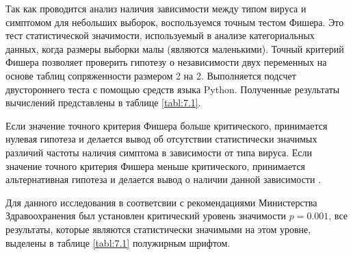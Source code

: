 \documentclass{article}
\begin{document}
Так как проводится анализ наличия зависимости между типом вируса и симптомом для небольших выборок, воспользуемся точным тестом Фишера. Это тест статистической значимости, используемый в анализе категориальных данных, когда размеры выборки малы (являются маленькими). Точный критерий Фишера позволяет проверить гипотезу о независимости двух переменных на основе таблиц сопряженности размером 2 на 2.  Выполняется подсчет двустороннего теста с помощью средств языка Python. Полученные результаты вычислений представлены в таблице \ref{tabl:7.1}.

Если значение точного критерия Фишера больше критического, принимается нулевая гипотеза и делается вывод об отсутствии статистически значимых различий частоты наличия симптома в зависимости от типа вируса. Если значение точного критерия Фишера меньше критического, принимается альтернативная гипотеза и делается вывод о наличии данной зависимости \cite{ss4}. 

Для данного исследования в соответсвии с рекомендациями Министерства Здравоохранения был установлен критический уровень значимости $p=0.001$, все результаты, которые являются статистически значимыми на этом уровне, выделены в таблице \ref{tabl:7.1} полужирным шрифтом.
\end{document}
